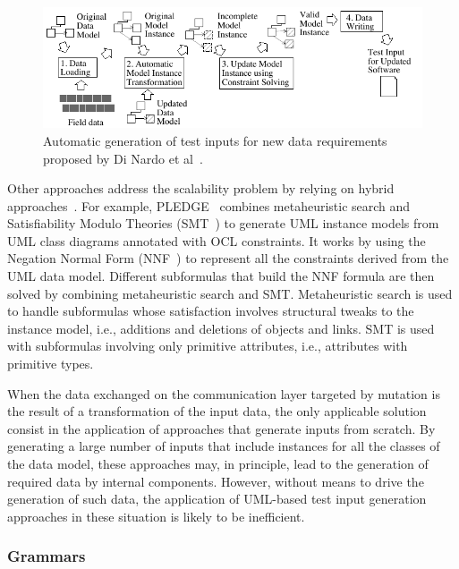 \begin{figure}[t!]
  \centering
    \includegraphics{images/DiNardoTOSEM}
      \caption{Automatic generation of test inputs for new data requirements proposed by Di Nardo et al~\cite{di2017augmenting}.}
      \label{fig:DiNardo}
\end{figure}

Other approaches address the scalability problem by relying on hybrid approaches~\cite{soltana2019practical}.
For example, PLEDGE~\cite{soltana2019practical} combines metaheuristic search and Satisfiability Modulo Theories (SMT~\cite{SMT:2011}) to generate UML instance models from UML class diagrams annotated with OCL constraints. It  works by using the Negation Normal Form (NNF~\cite{NNF:2001}) to represent all the constraints derived from the UML data model. Different subformulas that build the NNF formula are then solved by combining metaheuristic search and SMT. Metaheuristic search is used to handle subformulas whose satisfaction involves structural tweaks to the instance model, i.e., additions and deletions of objects and links. SMT is used with subformulas involving only primitive attributes, i.e., attributes with primitive types. 


When the data exchanged on the communication layer targeted by mutation is the result of a transformation of the input data, the only applicable solution consist in the application of approaches that generate inputs from scratch. By generating a large number of inputs that include instances for all the classes of the data model, these approaches may, in principle, lead to the generation of required data by internal components. However, without means to drive the generation of such data, the application of UML-based test input generation approaches in these situation is likely to be inefficient.


\subsubsection{Grammars}


